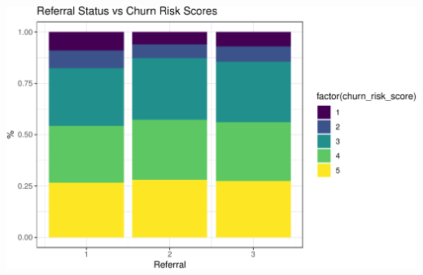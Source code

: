 \documentclass[
  letterpaper,
  DIV=11,
  numbers=noendperiod]{scrartcl}
\begin{document}
\begin{center}
\includegraphics{FPCP4_files/figure-pdf/unnamed-chunk-30-1.pdf}
\end{center}
\end{document}
